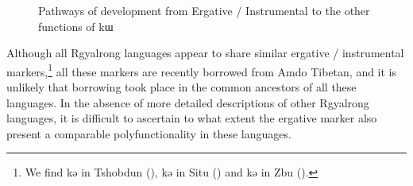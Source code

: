 \documentclass[oldfontcommands,oneside,a4paper,11pt]{article}
\newcommand{\ipa}[1]{{\phon #1}} %
\begin{document}
   \begin{figure}[H]
   \caption{Pathways of development from Ergative / Instrumental to the other functions of \ipa{kɯ}} \label{fig:scenario}  
\end{figure}

Although all Rgyalrong languages appear to share similar ergative / instrumental markers,\footnote{We find \ipa{kə} in Tshobdun (\citealt[129-131]{jackson98morphology}),  \ipa{kə} in Situ (\citealt[336]{linxr93jiarong}) and  \ipa{kə} in Zbu  (\citealt{gongxun14agreement}).} all these markers are recently borrowed from Amdo Tibetan, and it is unlikely that borrowing took place in the common ancestors of all these languages. In the absence of more detailed descriptions of other Rgyalrong languages, it is difficult to ascertain to what extent the ergative marker also present a comparable polyfunctionality in these languages.


  


\end{document}
